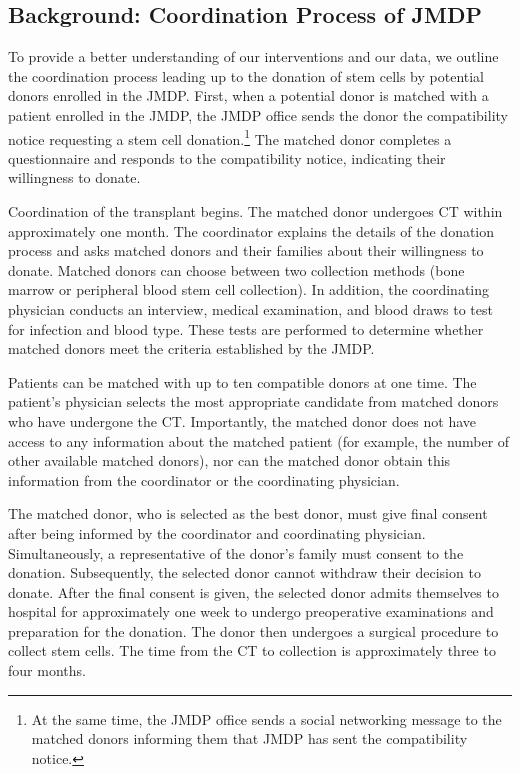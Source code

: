 \documentclass[12pt, a4paper]{article}
\begin{document}
\hypertarget{background}{%
\subsection{Background: Coordination Process of JMDP}\label{background}}

To provide a better understanding of our interventions and our data, we outline the coordination process leading up to the donation of stem cells by potential donors enrolled in the JMDP. First, when a potential donor is matched with a patient enrolled in the JMDP, the JMDP office sends the donor the compatibility notice requesting a stem cell donation.\footnote{At the same time, the JMDP office sends a social networking message to the matched donors informing them that JMDP has sent the compatibility notice.} The matched donor completes a questionnaire and responds to the compatibility notice, indicating their willingness to donate.

Coordination of the transplant begins. The matched donor undergoes CT within approximately one month. The coordinator explains the details of the donation process and asks matched donors and their families about their willingness to donate. Matched donors can choose between two collection methods (bone marrow or peripheral blood stem cell collection). In addition, the coordinating physician conducts an interview, medical examination, and blood draws to test for infection and blood type. These tests are performed to determine whether matched donors meet the criteria established by the JMDP.

Patients can be matched with up to ten compatible donors at one time. The patient's physician selects the most appropriate candidate from matched donors who have undergone the CT. Importantly, the matched donor does not have access to any information about the matched patient (for example, the number of other available matched donors), nor can the matched donor obtain this information from the coordinator or the coordinating physician.

The matched donor, who is selected as the best donor, must give final consent after being informed by the coordinator and coordinating physician. Simultaneously, a representative of the donor's family must consent to the donation. Subsequently, the selected donor cannot withdraw their decision to donate. After the final consent is given, the selected donor admits themselves to hospital for approximately one week to undergo preoperative examinations and preparation for the donation. The donor then undergoes a surgical procedure to collect stem cells. The time from the CT to collection is approximately three to four months.
\end{document}
